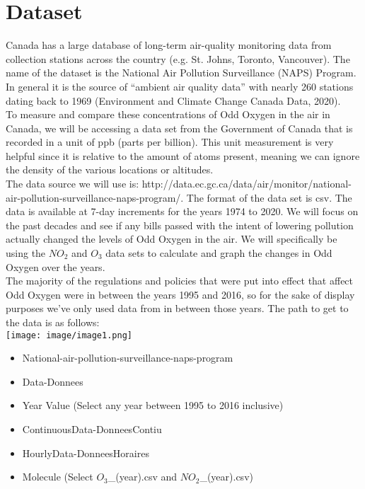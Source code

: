 \documentclass[fontsize=11pt]{article}
\begin{document}
\section*{Dataset}

Canada has a large database of long-term air-quality monitoring data from collection stations across the country (e.g. St. Johns, Toronto, Vancouver). The name of the dataset is the National Air Pollution Surveillance (NAPS) Program. In general it is the source of “ambient air quality data” with nearly 260 stations dating back to 1969 (Environment and Climate Change Canada Data, 2020).\\

To measure and compare these concentrations of Odd Oxygen in the air in Canada, we will be accessing a data set from the Government of Canada that is recorded in a unit of ppb (parts per billion). This unit measurement is very helpful since it is relative to the amount of atoms present, meaning we can ignore the density of the various locations or altitudes.\\

The data source we will use is: http://data.ec.gc.ca/data/air/monitor/national-air-pollution-surveillance-naps-program/. The format of the data set is csv. The data is available at 7-day increments for the years 1974 to 2020. We will focus on the past decades and see if any bills passed with the intent of lowering pollution actually changed the levels of Odd Oxygen in the air. We will specifically be using the $NO_2$ and $O_3$ data sets to calculate and graph the changes in Odd Oxygen over the years.\\

The majority of the regulations and policies that were put into effect that affect Odd Oxygen were in between the years 1995 and 2016, so for the sake of display purposes we’ve only used data from in between those years. The path to get to the data is as follows:\\

\texttt{[image: image/image1.png]} \\

\begin{itemize}
  \item National-air-pollution-surveillance-naps-program
  \item Data-Donnees
  \item Year Value (Select any year between 1995 to 2016 inclusive)
  \item ContinuousData-DonneesContiu
  \item HourlyData-DonneesHoraires
  \item Molecule (Select $O_3$\_(year).csv and $NO_2$\_(year).csv)
\end{itemize}
\end{document}
